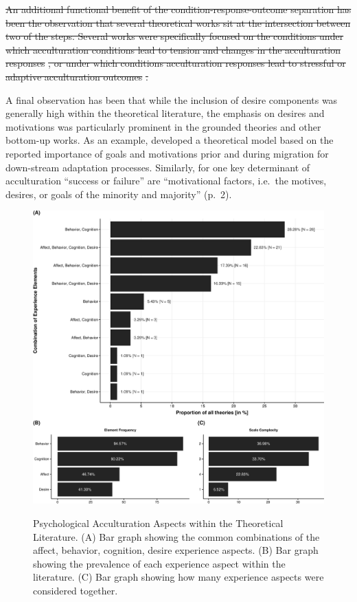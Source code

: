 \documentclass[man, 12pt, a4paper, mask]{apa7}
\newcommand{\fgrref}[2][]{\hyperref[#2]{Figure \ref*{#2}#1}}
\providecommand{\DIFdeltex}[1]{{\protect\color{red}\sout{#1}}}                      %
\providecommand{\DIFdelbegin}{} %
\providecommand{\DIFdelend}{} %
\providecommand{\DIFdel}[1]{\texorpdfstring{\DIFdeltex{#1}}{}} %
\newcommand{\DIFscaledelfig}{0.5}
\newlength{\DIFdelgraphicswidth} %
\newlength{\DIFdelgraphicsheight} %
\newcommand{\DIFdelincludegraphics}[2][]{%
\sbox{\DIFdelgraphicsbox}{\DIFOincludegraphics[#1]{#2}}%
\settoboxwidth{\DIFdelgraphicswidth}{\DIFdelgraphicsbox} %
\settoboxtotalheight{\DIFdelgraphicsheight}{\DIFdelgraphicsbox} %
\scalebox{\DIFscaledelfig}{%
\parbox[b]{\DIFdelgraphicswidth}{\usebox{\DIFdelgraphicsbox}\\[-\baselineskip] \rule{\DIFdelgraphicswidth}{0em}}\llap{\resizebox{\DIFdelgraphicswidth}{\DIFdelgraphicsheight}{%
\setlength{\unitlength}{\DIFdelgraphicswidth}%
\begin{picture}(1,1)%
\thicklines\linethickness{2pt} %
{\color[rgb]{1,0,0}\put(0,0){\framebox(1,1){}}}%
{\color[rgb]{1,0,0}\put(0,0){\line( 1,1){1}}}%
{\color[rgb]{1,0,0}\put(0,1){\line(1,-1){1}}}%
\end{picture}%
}\hspace*{3pt}}} %
} %
\DeclareRobustCommand{\DIFdelbegin}{\DIFOdelbegin \let\includegraphics\DIFdelincludegraphics} %
\DeclareRobustCommand{\DIFdelend}{\DIFOaddend \let\includegraphics\DIFOincludegraphics} %
\begin{document}
\DIFdelbegin \DIFdel{An additional functional benefit of the condition-response-outcome
separation has been the observation that several theoretical works sit
at the intersection between two of the steps. Several works were
specifically focused on the conditions under which acculturation
conditions lead to tension and changes in the acculturation responses
}%
\DIFdel{,
or under which conditions acculturation responses lead to stressful or
adaptive acculturation outcomes
}%
\DIFdel{.
}%

\DIFdelend A final observation has been that while the inclusion of desire
components was generally high within the theoretical literature, the
emphasis on desires and motivations was particularly prominent in the
grounded theories and other bottom-up works. As an example,
\citet[][]{Kim2019} developed a theoretical model based on the reported
importance of goals and motivations prior and during migration for
down-stream adaptation processes. Similarly, for
\citet[][]{Mchitarjan2015} one key determinant of acculturation
``success or failure'' are ``motivational factors, i.e.~the motives,
desires, or goals of the minority and majority'' (p.~2).

\begin{figure}[h]
\centering
\caption{Psychological Acculturation Aspects within the Theoretical Literature. (A) Bar graph showing the common combinations of the affect, behavior, cognition, desire experience aspects. (B) Bar graph showing the prevalence of each experience aspect within the literature. (C) Bar graph showing how many experience aspects were considered together.}
\includegraphics[width=\textwidth]{Figures/TheoriesFreq-1}
\label{fig:ElementsTheories}
\end{figure}
\end{document}
